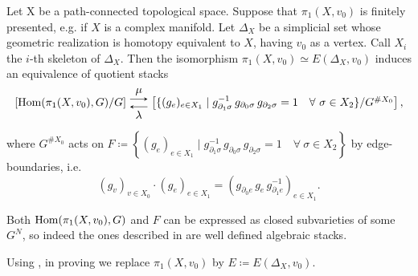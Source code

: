 \begin{prop}\label{prop: stack of local systems - simplicial version}
Let X be a path-connected topological space. Suppose that $\pi_{1}(X, v_0)$ is finitely presented, e.g. if $X$ is a complex manifold. Let $\Delta_X$ be a simplicial set whose geometric realization is homotopy equivalent to $X$, having $v_0$ as a vertex. Call $X_i$ the $i$-th skeleton of $\Delta_X$.
Then the isomorphism $\pi_1(X, v_0) \simeq E(\Delta_X, v_0)$ induces an equivalence of quotient stacks
\begin{equation}
\begin{tikzpicture}[>=stealth]

  \node (left) at (0,0) {
    $\left[ \text{Hom}(\pi_1(X, v_0), G) / G \right]$
  };

  \node (right) at (6.5,0) {
    $\left[ \{ (g_e)_{e \in X_1} \mid g_{\partial_1 \sigma}^{-1} 
            \, g_{\partial_0 \sigma} \, g_{\partial_2 \sigma} = 1 
            \quad \forall \ \sigma \in X_2 \} / G^{\# X_0} 
    \right],$
  };

  \draw[->, transform canvas={yshift=0.8ex}] (left) -- (right) 
    node[midway, above] {$\mu$};

  \draw[<-, transform canvas={yshift=-0.8ex}] (left) -- (right) 
    node[midway, below] {$\lambda$};

\end{tikzpicture}
\end{equation}
where $G^{\# X_0}$ acts on $F \coloneqq \left\{ (g_e)_{e \in X_1} \mid g_{\partial_1 \sigma}^{-1} \, g_{\partial_0 \sigma} \, g_{\partial_2 \sigma} = 1 \quad \forall \ \sigma \in X_2 \right\}$ by edge-boundaries, i.e.
\begin{equation}
(g_v)_{v \in X_0} \cdot (g_e)_{e \in X_1} = (g_{\partial_0 e} \, g_e \, g_{\partial_1 e}^{-1})_{e \in X_1}.
\end{equation}
\end{prop}

\begin{rmk}
Both $\operatorname{Hom}(\pi_1(X, v_0), G)$ and $F$ can be expressed as closed subvarieties of some $G^N$, so indeed the ones described in  are well defined algebraic stacks.
\end{rmk}

Using , in proving  we replace $\pi_1(X, v_0)$ by $E \coloneqq E(\Delta_X, v_0)$.


